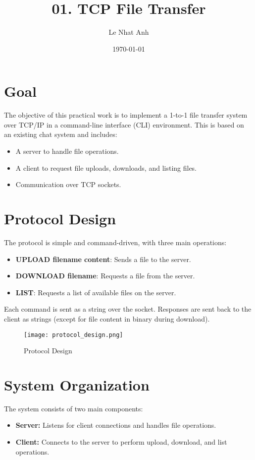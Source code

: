 \documentclass[a4paper,12pt]{article}
\title{01. TCP File Transfer}
\author{Le Nhat Anh}
\date{\today}
\begin{document}
\maketitle

\section*{Goal}
The objective of this practical work is to implement a 1-to-1 file transfer system over TCP/IP in a command-line interface (CLI) environment. This is based on an existing chat system and includes:
\begin{itemize}
    \item A server to handle file operations.
    \item A client to request file uploads, downloads, and listing files.
    \item Communication over TCP sockets.
\end{itemize}

\section*{Protocol Design}
The protocol is simple and command-driven, with three main operations:
\begin{itemize}
    \item \textbf{UPLOAD filename content}: Sends a file to the server.
    \item \textbf{DOWNLOAD filename}: Requests a file from the server.
    \item \textbf{LIST}: Requests a list of available files on the server.
\end{itemize}

Each command is sent as a string over the socket. Responses are sent back to the client as strings (except for file content in binary during download).

\begin{figure}[h]
    \centering
    \texttt{[image: protocol\_design.png]} %
    \caption{Protocol Design}
    \label{fig:protocol}
\end{figure}

\section*{System Organization}
The system consists of two main components:
\begin{itemize}
    \item \textbf{Server:} Listens for client connections and handles file operations.
    \item \textbf{Client:} Connects to the server to perform upload, download, and list operations.
\end{itemize}
\end{document}
